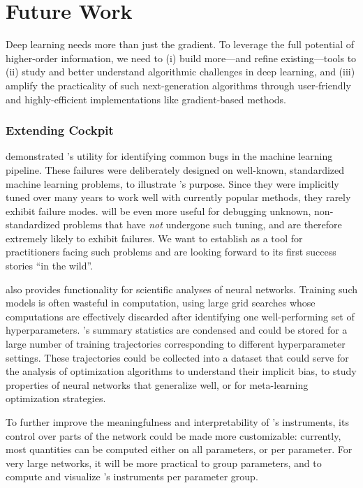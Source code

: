 \section{Future Work}

Deep learning needs more than just the gradient. To leverage the full potential
of higher-order information, we need to (i) build more---and refine
existing---tools to (ii) study and better understand algorithmic challenges in
deep learning, and (iii) amplify the practicality of such next-generation
algorithms through user-friendly and highly-efficient implementations like
gradient-based methods.

\subsubsection{Extending Cockpit}

 demonstrated \cockpit's utility for identifying common bugs
in the machine learning pipeline. These failures were deliberately designed on
well-known, standardized machine learning problems, to illustrate \cockpit's
purpose. Since they were implicitly tuned over many years to work well with
currently popular methods, they rarely exhibit failure modes. \cockpit will be
even more useful for debugging unknown, non-standardized problems that have
\emph{not} undergone such tuning, and are therefore extremely likely to exhibit
failures. We want to establish \cockpit as a tool for practitioners facing such
problems and are looking forward to its first success stories ``in the wild''.

\cockpit also provides functionality for scientific analyses of neural networks.
Training such models is often wasteful in computation, \eg using large grid
searches whose computations are effectively discarded after identifying one
well-performing set of hyperparameters. \cockpit's summary statistics are
condensed and could be stored for a large number of training trajectories
corresponding to different hyperparameter settings. These trajectories could be
collected into a dataset that could serve for the analysis of optimization
algorithms to understand their implicit bias, to study properties of neural
networks that generalize well, or for meta-learning optimization strategies.

To further improve the meaningfulness and interpretability of \cockpit's
instruments, its control over parts of the network could be made more
customizable: currently, most quantities can be computed either on all
parameters, or per parameter. For very large networks, it will be more practical
to group parameters, and to compute and visualize \cockpit's instruments per
parameter group.

